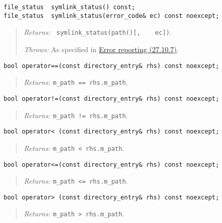 \begin{verbatim}
file_status  symlink_status() const;
file_status  symlink_status(error_code& ec) const noexcept;
\end{verbatim}

\begin{quote}
\emph{Returns:} \texttt{\ symlink\_status(path(){[},\ \ \ \ ec{]})}.

\emph{Throws:} As specified in \hyperref[Error-reporting]{Error
reporting (27.10.7)}.
\end{quote}

\begin{verbatim}
bool operator==(const directory_entry& rhs) const noexcept;
\end{verbatim}

\begin{quote}
\emph{Returns:} \texttt{m\_path\ ==\ rhs.m\_path}.
\end{quote}

\begin{verbatim}
bool operator!=(const directory_entry& rhs) const noexcept;
\end{verbatim}

\begin{quote}
\emph{Returns:} \texttt{m\_path\ !=\ rhs.m\_path}.
\end{quote}

\begin{verbatim}
bool operator< (const directory_entry& rhs) const noexcept;
\end{verbatim}

\begin{quote}
\emph{Returns:} \texttt{m\_path\ \textless{}\ rhs.m\_path}.
\end{quote}

\begin{verbatim}
bool operator<=(const directory_entry& rhs) const noexcept;
\end{verbatim}

\begin{quote}
\emph{Returns:} \texttt{m\_path\ \textless{}=\ rhs.m\_path}.
\end{quote}

\begin{verbatim}
bool operator> (const directory_entry& rhs) const noexcept;
\end{verbatim}

\begin{quote}
\emph{Returns:} \texttt{m\_path\ \textgreater{}\ rhs.m\_path}.
\end{quote}

